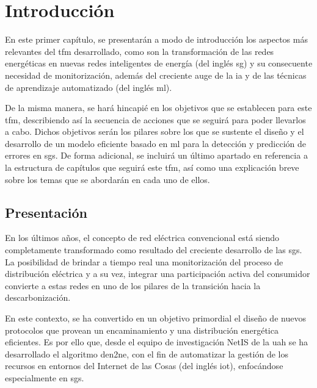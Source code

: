 
\chapter{Introducción}
\label{ch:intro}

En este primer capítulo, se presentarán a modo de introducción los aspectos más relevantes del \gls{tfm} desarrollado, como son la transformación de las redes energéticas en nuevas redes inteligentes de energía (del inglés \gls{sg}) y su consecuente necesidad de monitorización, además del creciente auge de la \gls{ia} y de las técnicas de aprendizaje automatizado (del inglés \gls{ml}).

\vspace{3mm}

De la misma manera, se hará hincapié en los objetivos que se establecen para este \gls{tfm}, describiendo así la secuencia de acciones que se seguirá para poder llevarlos a cabo. Dichos objetivos serán los pilares sobre los que se sustente el diseño y el desarrollo de un modelo eficiente basado en \gls{ml} para la detección y predicción de errores en \gls{sgs}. De forma adicional, se incluirá un último apartado en referencia a la estructura de capítulos que seguirá este \gls{tfm}, así como una explicación breve sobre los temas que se abordarán en cada uno de ellos.


\section{Presentación}
\label{sec:presentacion}

En los últimos años, el concepto de red eléctrica convencional está siendo completamente transformado como resultado del creciente desarrollo de las \gls{sgs}. La posibilidad de brindar a tiempo real una monitorización del proceso de distribución eléctrica y a su vez, integrar una participación activa del consumidor convierte a estas redes en uno de los pilares de la
transición hacia la descarbonización. 

\vspace{3mm}

En este contexto, se ha convertido en un objetivo primordial el diseño de nuevos protocolos que provean un encaminamiento y una distribución energética eficientes. Es por ello que, desde el equipo de investigación NetIS de la \gls{uah} se ha desarrollado el algoritmo \gls{den2ne}, con el fin de automatizar la gestión de los recursos en entornos del Internet de las Cosas (del inglés \gls{iot}), enfocándose especialmente en \gls{sgs}.

